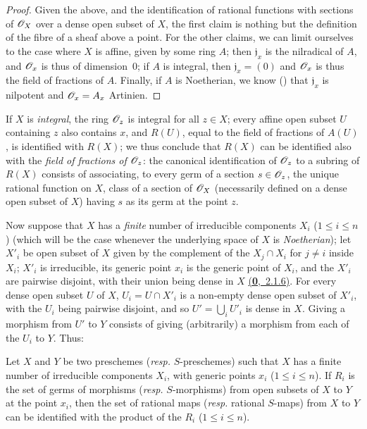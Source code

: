\begin{proof}
\label{proof-1.7.1.5}
Given the above, and the identification of rational functions with sections of $\mathscr{O}_X$ over a dense open subset of $X$, the first claim is nothing but the definition of the fibre of a sheaf above a point.
For the other claims, we can limit ourselves to the case where $X$ is affine, given by some ring $A$; then $\mathfrak{j}_x$ is the nilradical of $A$, and $\mathscr{O}_x$ is thus of dimension~0; if $A$ is integral, then $\mathfrak{j}_x=(0)$ and $\mathscr{O}_x$ is thus the field of fractions of $A$.
Finally, if $A$ is Noetherian, we know (\cite[p.~127, cor.~4]{I-11}) that $\mathfrak{j}_x$ is nilpotent and $\mathscr{O}_x=A_x$ Artinien.
\end{proof}

If $X$ is \emph{integral}, the ring $\mathscr{O}_z$ is integral for all $z\in X$; every affine open subset $U$ containing $z$ also contains $x$, and $R(U)$, equal to the field of fractions of $A(U)$, is identified with $R(X)$; we thus conclude that $R(X)$ can be identified also with the \emph{field of fractions of $\mathscr{O}_z$}: the canonical identification of $\mathscr{O}_z$ to a subring of $R(X)$ consists of associating, to every germ of a section $s\in\mathscr{O}_z$, the unique rational function on $X$,  class of a section of $\mathscr{O}_X$ (necessarily defined on a dense open subset of $X$) having $s$ as its germ at the point $z$.

\begin{env}[7.1.6]
\label{1.7.1.6}
Now suppose that $X$ has a \emph{finite} number of irreducible components $X_i$ ($1\leqslant i\leqslant n$) (which will be the case whenever the underlying space of $X$ is \emph{Noetherian}); let $X'_i$ be open subset of $X$ given by the complement of the $X_j\cap X_i$ for $j\neq i$ inside $X_i$; $X'_i$ is irreducible, its generic point $x_i$ is the generic point of $X_i$, and the $X'_i$ are pairwise disjoint, with their union being dense in $X$ \hyperref[0.2.1.6]{(\textbf{0},~2.1.6)}.
For every dense open subset $U$ of $X$, $U_i=U\cap X'_i$ is a non-empty dense open subset of $X'_i$, with the $U_i$ being pairwise disjoint, and so $U'=\bigcup_i U'_i$ is dense in $X$.
Giving a morphism from $U'$ to $Y$ consists of giving (arbitrarily) a morphism from each of the $U_i$ to $Y$.
Thus:
\end{env}

\begin{prop}[7.1.7]
\label{1.7.1.7}
Let $X$ and $Y$ be two preschemes (\emph{resp.} $S$-preschemes) such that $X$ has a finite number of irreducible components $X_i$, with generic points $x_i$ ($1\leqslant i\leqslant n$).
If $R_i$ is the set of germs of morphisms (\emph{resp.} $S$-morphisms) from open subsets of $X$ to $Y$ at the point $x_i$, then the set of rational maps (\emph{resp.} rational $S$-maps) from $X$ to $Y$ can be identified with the product of the $R_i$ ($1\leqslant i\leqslant n$).
\end{prop}

